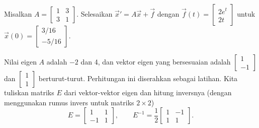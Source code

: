 \begin{example}
Misalkan $A = \left[
\begin{smallmatrix}
1 & 3 \\
3 & 1
\end{smallmatrix} \right]$.
Selesaikan ${\vec{x}}' = A \vec{x} +
\vec{f}$ dengan $\vec{f}(t) = 
\left[ \begin{smallmatrix}
2e^t \\
2t
\end{smallmatrix} \right]$ untuk $\vec{x}(0) =
\left[ \begin{smallmatrix}
3/16 \\
-5/16
\end{smallmatrix} \right]$.

Nilai eigen $A$ adalah $-2$ dan 4, dan vektor eigen yang bersesuaian
adalah
$\left[ \begin{smallmatrix}
1 \\
-1
\end{smallmatrix} \right]$ dan
$\left[ \begin{smallmatrix}
1 \\
1
\end{smallmatrix} \right]$ berturut-turut.  Perhitungan ini diserahkan sebagai
latihan.  Kita tuliskan matriks $E$ dari vektor-vektor eigen dan hitung
inversnya (dengan menggunakan rumus invers untuk matriks $2 \times 2$)
\begin{equation*}
E = \begin{bmatrix}
1 & 1 \\
-1 & 1
\end{bmatrix} ,
\qquad
E^{-1}
=
\frac{1}{2}
\begin{bmatrix}
1 & -1 \\
1 & 1
\end{bmatrix} .
\end{equation*}


\end{example}
